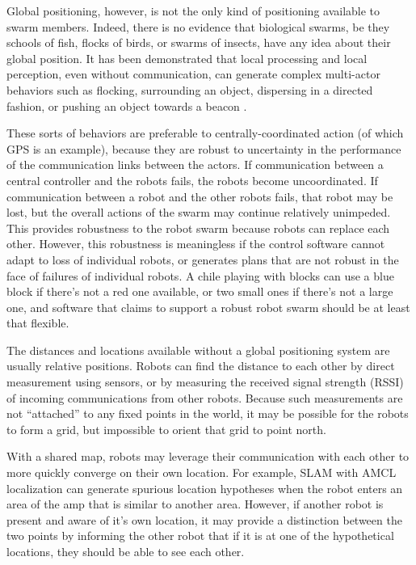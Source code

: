 \documentclass[]{article}
\begin{document}
Global positioning, however, is not the only kind of positioning available to swarm members. 
Indeed, there is no evidence that biological swarms, be they schools of fish, flocks of birds, or swarms of insects, have any idea about their global position. 
It has been demonstrated that local processing and local perception, even without communication, can generate complex multi-actor behaviors such as flocking, surrounding an object, dispersing in a directed fashion, or pushing an object towards a beacon \cite{mclurkin2004stupid, chen2015occlusion, reynolds1987flocks}.

These sorts of behaviors are preferable to centrally-coordinated action (of which GPS is an example), because they are robust to uncertainty in the performance of the communication links between the actors. 
If communication between a central controller and the robots fails, the robots become uncoordinated. 
If communication between a robot and the other robots fails, that robot may be lost, but the overall actions of the swarm may continue relatively unimpeded.  
This provides robustness to the robot swarm because robots can replace each other. 
However, this robustness is meaningless if the control software cannot adapt to loss of individual robots, or generates plans that are not robust in the face of failures of individual robots. 
A chile playing with blocks can use a blue block if there's not a red one available, or two small ones if there's not a large one, and software that claims to support a robust robot swarm should be at least that flexible.


The distances and locations available without a global positioning system are usually relative positions. 
Robots can find the distance to each other by direct measurement using sensors, or by measuring the received signal strength (RSSI) of incoming communications from other robots.
Because such measurements are not ``attached'' to any fixed points in the world, it may be possible for the robots to form a grid, but impossible to orient that grid to point north. 

With a shared map, robots may leverage their communication with each other to more quickly converge on their own location. 
For example, SLAM with AMCL localization can generate spurious location hypotheses when the robot enters an area of the amp that is similar to another area. However, if another robot is present and aware of it's own location, it may provide a distinction between the two points by informing the other robot that if it is at one of the hypothetical locations, they should be able to see each other. 
\end{document}
